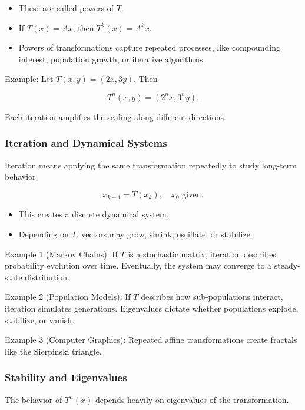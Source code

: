 \documentclass[
  letterpaper,
  DIV=11,
  numbers=noendperiod]{scrreprt}
\providecommand{\tightlist}{%
  \setlength{\itemsep}{0pt}\setlength{\parskip}{0pt}}
\begin{document}
\begin{itemize}
\tightlist
\item
  These are called powers of \(T\).
\item
  If \(T(x) = Ax\), then \(T^k(x) = A^k x\).
\item
  Powers of transformations capture repeated processes, like compounding
  interest, population growth, or iterative algorithms.
\end{itemize}

Example: Let \(T(x,y) = (2x, 3y)\). Then

\[
T^n(x,y) = (2^n x, 3^n y).
\]

Each iteration amplifies the scaling along different directions.

\subsubsection{Iteration and Dynamical
Systems}\label{iteration-and-dynamical-systems}

Iteration means applying the same transformation repeatedly to study
long-term behavior:

\[
x_{k+1} = T(x_k), \quad x_0 \text{ given}.
\]

\begin{itemize}
\tightlist
\item
  This creates a discrete dynamical system.
\item
  Depending on \(T\), vectors may grow, shrink, oscillate, or stabilize.
\end{itemize}

Example 1 (Markov Chains): If \(T\) is a stochastic matrix, iteration
describes probability evolution over time. Eventually, the system may
converge to a steady-state distribution.

Example 2 (Population Models): If \(T\) describes how sub-populations
interact, iteration simulates generations. Eigenvalues dictate whether
populations explode, stabilize, or vanish.

Example 3 (Computer Graphics): Repeated affine transformations create
fractals like the Sierpinski triangle.

\subsubsection{Stability and
Eigenvalues}\label{stability-and-eigenvalues}

The behavior of \(T^n(x)\) depends heavily on eigenvalues of the
transformation.
\end{document}
